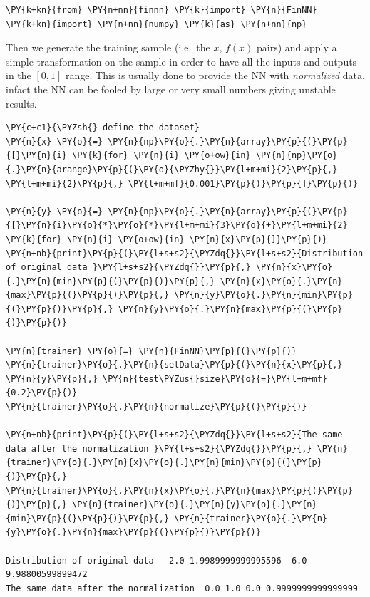 \begin{tcolorbox}[breakable, size=fbox, boxrule=1pt, pad at break*=1mm,colback=cellbackground, colframe=cellborder]
\begin{Verbatim}[commandchars=\\\{\}]
\PY{k+kn}{from} \PY{n+nn}{finnn} \PY{k}{import} \PY{n}{FinNN}
\PY{k+kn}{import} \PY{n+nn}{numpy} \PY{k}{as} \PY{n+nn}{np}
\end{Verbatim}
\end{tcolorbox}

Then we generate the training sample (i.e.~the \(x\), \(f(x)\) pairs)
and apply a simple transformation on the sample in order to have all the
inputs and outputs in the \([0, 1]\) range. This is usually done to
provide the NN with \emph{normalized} data, infact the NN can be fooled
by large or very small numbers giving unstable results.

\begin{tcolorbox}[breakable, size=fbox, boxrule=1pt, pad at break*=1mm,colback=cellbackground, colframe=cellborder]
\begin{Verbatim}[commandchars=\\\{\}]
\PY{c+c1}{\PYZsh{} define the dataset}
\PY{n}{x} \PY{o}{=} \PY{n}{np}\PY{o}{.}\PY{n}{array}\PY{p}{(}\PY{p}{[}\PY{n}{i} \PY{k}{for} \PY{n}{i} \PY{o+ow}{in} \PY{n}{np}\PY{o}{.}\PY{n}{arange}\PY{p}{(}\PY{o}{\PYZhy{}}\PY{l+m+mi}{2}\PY{p}{,} \PY{l+m+mi}{2}\PY{p}{,} \PY{l+m+mf}{0.001}\PY{p}{)}\PY{p}{]}\PY{p}{)}
	
\PY{n}{y} \PY{o}{=} \PY{n}{np}\PY{o}{.}\PY{n}{array}\PY{p}{(}\PY{p}{[}\PY{n}{i}\PY{o}{*}\PY{o}{*}\PY{l+m+mi}{3}\PY{o}{+}\PY{l+m+mi}{2} \PY{k}{for} \PY{n}{i} \PY{o+ow}{in} \PY{n}{x}\PY{p}{]}\PY{p}{)}
\PY{n+nb}{print}\PY{p}{(}\PY{l+s+s2}{\PYZdq{}}\PY{l+s+s2}{Distribution of original data }\PY{l+s+s2}{\PYZdq{}}\PY{p}{,} \PY{n}{x}\PY{o}{.}\PY{n}{min}\PY{p}{(}\PY{p}{)}\PY{p}{,} \PY{n}{x}\PY{o}{.}\PY{n}{max}\PY{p}{(}\PY{p}{)}\PY{p}{,} \PY{n}{y}\PY{o}{.}\PY{n}{min}\PY{p}{(}\PY{p}{)}\PY{p}{,} \PY{n}{y}\PY{o}{.}\PY{n}{max}\PY{p}{(}\PY{p}{)}\PY{p}{)}
	
\PY{n}{trainer} \PY{o}{=} \PY{n}{FinNN}\PY{p}{(}\PY{p}{)}
\PY{n}{trainer}\PY{o}{.}\PY{n}{setData}\PY{p}{(}\PY{n}{x}\PY{p}{,} \PY{n}{y}\PY{p}{,} \PY{n}{test\PYZus{}size}\PY{o}{=}\PY{l+m+mf}{0.2}\PY{p}{)}
\PY{n}{trainer}\PY{o}{.}\PY{n}{normalize}\PY{p}{(}\PY{p}{)}
	
\PY{n+nb}{print}\PY{p}{(}\PY{l+s+s2}{\PYZdq{}}\PY{l+s+s2}{The same data after the normalization }\PY{l+s+s2}{\PYZdq{}}\PY{p}{,} \PY{n}{trainer}\PY{o}{.}\PY{n}{x}\PY{o}{.}\PY{n}{min}\PY{p}{(}\PY{p}{)}\PY{p}{,} 
\PY{n}{trainer}\PY{o}{.}\PY{n}{x}\PY{o}{.}\PY{n}{max}\PY{p}{(}\PY{p}{)}\PY{p}{,} \PY{n}{trainer}\PY{o}{.}\PY{n}{y}\PY{o}{.}\PY{n}{min}\PY{p}{(}\PY{p}{)}\PY{p}{,} \PY{n}{trainer}\PY{o}{.}\PY{n}{y}\PY{o}{.}\PY{n}{max}\PY{p}{(}\PY{p}{)}\PY{p}{)}

Distribution of original data  -2.0 1.9989999999995596 -6.0 9.98800599899472
The same data after the normalization  0.0 1.0 0.0 0.9999999999999999
\end{Verbatim}
\end{tcolorbox}

